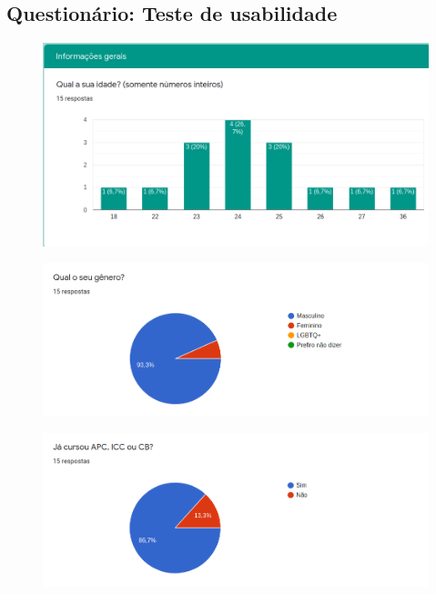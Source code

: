 \begin{apendicesenv}

\partapendices

\chapter{Questionário: Teste de usabilidade}
\label{apenda}


\begin{figure}[h]
	\centering
	\includegraphics[keepaspectratio=true,scale=0.4]{figuras/j1.png}
\end{figure}

\begin{figure}[h]
	\centering
	\includegraphics[keepaspectratio=true,scale=0.4]{figuras/j2.png}
\end{figure}

\begin{figure}[h]
	\centering
	\includegraphics[keepaspectratio=true,scale=0.4]{figuras/j3.png}
\end{figure}


\end{apendicesenv}
